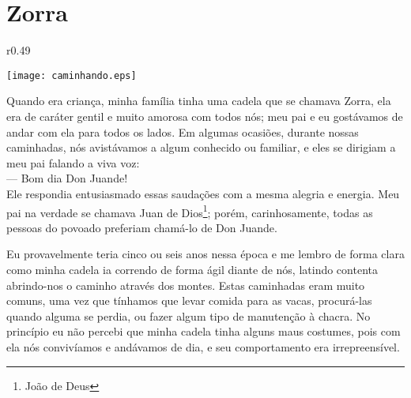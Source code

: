 \cleardoublepage
\newpage
\ifdefined\EnableIncludeImages
\fi
\chapter{Zorra}


\ifdefined\EnableIncludeImages
\begin{wrapfigure}{r}{0.49\textwidth}
  \begin{center}
  \vspace{-30pt}
    \texttt{[image: caminhando.eps]}
  \end{center}
  \vspace{-20pt}
\end{wrapfigure}
\fi
Quando era criança, minha família tinha uma cadela que se chamava Zorra, ela era de caráter gentil e muito amorosa com todos nós; meu pai e eu gostávamos de andar com ela para todos os lados. Em algumas ocasiões, durante nossas caminhadas, nós avistávamos a algum conhecido ou familiar, e eles se dirigiam a meu pai falando a viva voz:\\\indent 
--- Bom dia Don Juande!\\\indent
Ele respondia entusiasmado essas saudações com a mesma alegria e energia.
Meu pai na verdade se chamava Juan de Dios\footnote{João de Deus}; porém, carinhosamente, todas as pessoas do povoado preferiam chamá-lo de Don Juande.

Eu provavelmente teria cinco ou seis anos nessa época e me lembro de forma clara como minha cadela ia correndo de forma ágil diante de nós, latindo contenta abrindo-nos o caminho através dos montes.
Estas caminhadas eram muito comuns, uma vez que tínhamos que levar comida para as vacas, procurá-las quando alguma se perdia, ou fazer algum tipo de manutenção à chacra.
No princípio eu não percebi que minha cadela tinha alguns maus costumes, pois com ela nós convivíamos e andávamos de dia, e seu comportamento era irrepreensível. 

